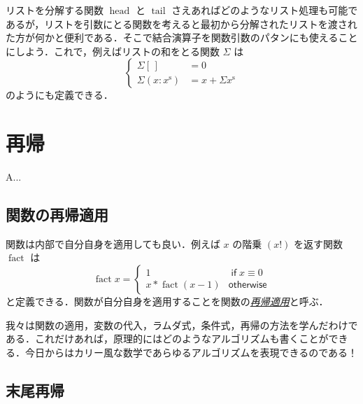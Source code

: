 \documentclass[a4paper,draft]{jsbook}
\newenvironment{leader}{\begingroup}{\endgroup}
\newcommand{\keyword}[1]{{\underline{\emph{#1}}}}
\newcommand{\mEmptyList}{{[\,]}}
\newcommand{\mListVar}[1]{{#1}^\mathrm{s}}
\DeclareMathOperator{\mHead}{head}
\DeclareMathOperator{\mTail}{tail}
\DeclareMathOperator{\mathFactorial}{fact}
\newcommand{\mathKeyword}[1]{\operatorname{\textsf{#1}}}
\newcommand{\mathIf}{\mathKeyword{if}}
\newcommand{\mathOtherwise}{\mathKeyword{otherwise}}
\begin{document}
リストを分解する関数 $\mHead$ と $\mTail$ さえあればどのようなリスト処理も可能であるが，リストを引数にとる関数を考えると最初から分解されたリストを渡された方が何かと便利である．そこで結合演算子を関数引数のパタンにも使えることにしよう．これで，例えばリストの和をとる関数 $\Sigma$ は
\begin{equation}
\left\{
\begin{split}
\Sigma\mEmptyList&=0\\
\Sigma(x:\mListVar{x})&=x+\Sigma\mListVar{x}
\end{split}
\right.
\end{equation}
のようにも定義できる．




\chapter{再帰}

\begin{leader}
A...
\end{leader}


\section{関数の再帰適用}

関数は内部で自分自身を適用しても良い．例えば $x$ の階乗 $(x!)$ を返す関数 $\mathFactorial$ は
\begin{equation}
\mathFactorial x=\begin{cases}
1&\mathIf x\equiv0\\
x*\mathFactorial(x-1)&\mathOtherwise
\end{cases}
\end{equation}
と定義できる．関数が自分自身を適用することを関数の\keyword{再帰適用}と呼ぶ．

我々は関数の適用，変数の代入，ラムダ式，条件式，再帰の方法を学んだわけである．これだけあれば，原理的にはどのようなアルゴリズムも書くことができる．今日からはカリー風な数学であらゆるアルゴリズムを表現できるのである！

\section{末尾再帰}
\end{document}
